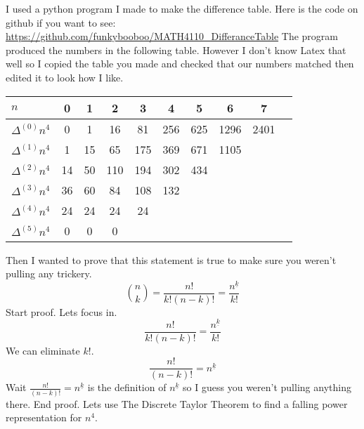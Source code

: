 \documentclass[10pt, AMS Euler]{article}
\newcommand{\ds}{\displaystyle}
\begin{document}
            I used a python program I made to make the difference table. 
            Here is the code on github if you want to see: 
            \newline \newline
            \url{https://github.com/funkybooboo/MATH4110_DifferanceTable} 
            \newline \newline
            The program produced the numbers in the following table. However I don't know Latex that well so I copied the table you made and checked that our numbers matched then edited it to look how I like.
            \begin{center}
                \begin{tabular}{l|ccccccccc}
                    {\bf $n$ } & 0 & 1 & 2 & 3 & 4 & 5 & 6 & 7  \\
                    \hline
                    {$\Delta^{(0)} n^4$} & 0 & 1 & 16 & 81 & 256 & 625 & 1296 & 2401   \\
                    {$\Delta^{(1)} n^4$} & 1& 15 & 65 & 175 & 369 & 671 & 1105 &    \\
                    {$\Delta^{(2)}n^4$} &  14 & 50 & 110 & 194 & 302 & 434 &  &   \\
                    {$\Delta^{(3)}n^4$} & 36 & 60 & 84 & 108 & 132 &  &  &    \\
                    {$\Delta^{(4)}n^4$} & 24 & 24 & 24 & 24 &  &  &  &    \\
                    {$\Delta^{(5)}n^4$} & 0 & 0 & 0 &  &  &  &  &    \\
                \end{tabular}
            \end{center}
            Then I wanted to prove that this statement is true to make sure you weren't pulling any trickery.
            $$\ds\binom{n}{k} = \frac{n!}{k!(n-k)!} = \frac{n^{\underline{k}}}{k!}$$
            Start proof.
            \newline
            Lets focus in.
            $$ \frac{n!}{k!(n-k)!} = \frac{n^{\underline{k}}}{k!} $$
            We can eliminate $k!$.
            $$ \frac{n!}{(n-k)!} = n^{\underline{k}} $$
            Wait $\frac{n!}{(n-k)!} = n^{\underline{k}}$ is the definition of $n^{\underline{k}}$ so I guess you weren't pulling anything there.
            \newline
            End proof.
            \newline
            Lets use The Discrete Taylor Theorem to find a falling power representation for $n^4$.
\end{document}
